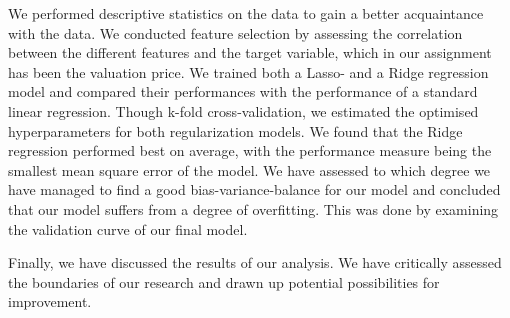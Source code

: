 \documentclass[12pt,a4paper]{article}
\begin{document}
We performed descriptive statistics on the data to gain a better acquaintance with the data. 
We conducted feature selection by assessing the correlation between the different features and the target variable, which in our assignment has been the valuation price. 
We trained both a Lasso- and a Ridge regression model and compared their performances with the performance of a standard linear regression. Though k-fold cross-validation, we estimated the optimised hyperparameters for both regularization models. We found that the Ridge regression performed best on average, with the performance measure being the smallest mean square error of the model. 
We have assessed to which degree we have managed to find a good bias-variance-balance for our model and concluded that our model suffers from a degree of overfitting. This was done by examining the validation curve of our final model.

Finally, we have discussed the results of our analysis. We have critically assessed the boundaries of our research and drawn up potential possibilities for improvement. 
\end{document}
